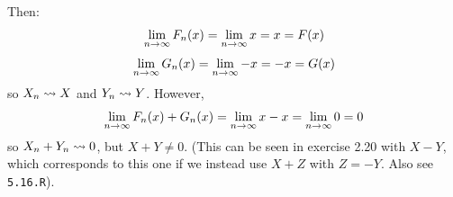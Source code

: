 Then:
$$
\lim_{n\rightarrow\infty} F_n(x) = \lim_{n\rightarrow\infty} x = x = F(x)
$$
$$
\lim_{n\rightarrow\infty} G_n(x) = \lim_{n\rightarrow\infty} -x = -x = G(x)
$$
so $X_n\rightsquigarrow X$ and $Y_n\rightsquigarrow Y$. However,
$$
\lim_{n\rightarrow\infty} F_n(x) + G_n(x) = \lim_{n\rightarrow\infty} x - x = \lim_{n\rightarrow\infty} 0 = 0
$$
so $X_n + Y_n \rightsquigarrow 0$, but $X + Y \not= 0$. (This can be seen in exercise 2.20 with $X-Y$,
which corresponds to this one if we instead use $X+Z$ with $Z=-Y$. Also see \texttt{5.16.R}).

